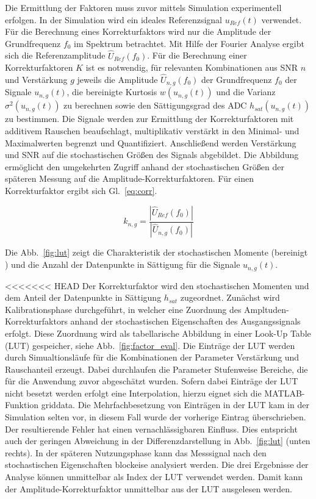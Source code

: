 Die Ermittlung der Faktoren muss zuvor mittels Simulation experimentell erfolgen. In der Simulation wird ein ideales Referenzsignal $u_{Ref}(t)$ verwendet. Für die Berechnung eines Korrekturfaktors wird nur die Amplitude der Grundfrequenz $f_0$ im Spektrum betrachtet. Mit Hilfe der Fourier Analyse ergibt sich die Referenzamplitude $\hat{U}_{Ref}(f_0)$. Für die Berechnung einer Korrekturfaktoren $K$ ist es notwendig, für relevanten Kombinationen aus SNR $n$ und Verstärkung $g$ jeweils die Amplitude $\hat{U}_{n,g}(f_0)$ der Grundfrequenz $f_0$ der Signale $u_{n,g}(t)$, die bereinigte Kurtosis $w(u_{n,g}(t))$ und die Varianz $\sigma^2(u_{n,g}(t))$ zu berechnen sowie den Sättigungsgrad des ADC $h_{sat}(u_{n,g}(t))$ zu bestimmen. Die Signale werden zur Ermittlung der Korrekturfaktoren mit additivem Rauschen beaufschlagt, multiplikativ verstärkt in den Minimal- und Maximalwerten begrenzt und Quantifiziert. Anschließend werden Verstärkung und SNR auf die stochastischen Größen des Signals abgebildet. Die Abbildung ermöglicht den umgekehrten Zugriff anhand der stochastischen Größen der späteren Messung auf die Amplitude-Korrekturfaktoren.
Für einen Korrekturfaktor ergibt sich Gl.~\eqref{eq:corr}.

\begin{equation}
	\label{eq:corr}
k_{n,g} = \frac{|\hat{U}_{Ref}(f_0)|}{|\hat{U}_{n,g}(f_0)|} %
\end{equation}

Die Abb.~\ref{fig:lut} zeigt die Charakteristik der stochastischen Momente (bereinigt ) und die Anzahl der Datenpunkte in Sättigung für die Signale $u_{n,g}(t)$. 

<<<<<<< HEAD
Der Korrekturfaktor wird den stochastischen Momenten und dem Anteil der Datenpunkte in Sättigung $h_{sat}$ zugeordnet.
Zunächst wird Kalibrationsphase durchgeführt, in welcher eine Zuordnung des Ampltuden-Korrekturfaktors anhand der stochastischen Eigenschaften des Ausgangssignals erfolgt. Diese Zuordnung wird als tabellarische Abbildung in einer Look-Up Table (LUT) gespeicher, siehe Abb.~\ref{fig:factor_eval}. 
Die Einträge der LUT werden durch Simualtionsläufe für die Kombinationen der Parameter Verstärkung und Rauschanteil erzeugt. Dabei durchlaufen die Parameter Stufenweise Bereiche, die für die Anwendung zuvor abgeschätzt wurden. Sofern dabei Einträge der LUT nicht besetzt werden erfolgt eine Interpolation, hierzu eignet sich die MATLAB-Funktion griddata. Die Mehrfachbesetzung von Einträgen in der LUT kam in der Simulation selten vor, in diesem Fall wurde der vorherige Eintrag überschrieben. Der resultierende Fehler hat einen vernachlässigbaren Einfluss. Dies entspricht auch der geringen Abweichung in der Differenzdarstellung in Abb.~\ref{fig:lut} (unten rechts). In der späteren Nutzungsphase kann das Messsignal nach den stochastischen Eigenschaften blockeise analysiert werden. Die drei Ergebnisse der Analyse können unmittelbar als Index der LUT verwendet werden. Damit kann der Amplitude-Korrekturfaktor unmittelbar aus der LUT ausgelesen werden. 

